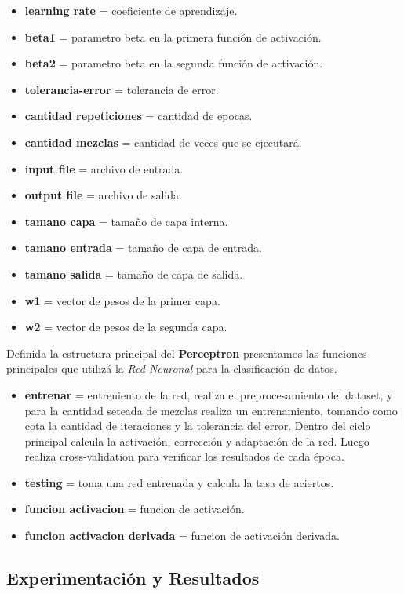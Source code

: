 \documentclass[onecolumn,10pt]{article}
\begin{document}
\begin{itemize}
\item \textbf{learning rate} = coeficiente de aprendizaje.
\item \textbf{beta1} = parametro beta en la primera función de activación.
\item \textbf{beta2} = parametro beta en la segunda función de activación.
\item \textbf{tolerancia-error} = tolerancia de error.
\item \textbf{cantidad repeticiones} = cantidad de epocas.
\item \textbf{cantidad mezclas} = cantidad de veces que se ejecutará.
\item \textbf{input file} = archivo de entrada.
\item \textbf{output file} = archivo de salida.
\item \textbf{tamano capa} = tamaño de capa interna.
\item \textbf{tamano entrada} = tamaño de capa de entrada.
\item \textbf{tamano salida} = tamaño de capa de salida.
\item \textbf{w1} = vector de pesos de la primer capa.
\item \textbf{w2} = vector de pesos de la segunda capa.
\end{itemize}


Definida la estructura principal del \textbf{Perceptron} presentamos
las funciones principales que utilizá la \emph{Red Neuronal} para
la clasificación de datos.


\begin{itemize}
\item \textbf{entrenar} = entreniento de la red, realiza el preprocesamiento
del dataset, y para la cantidad seteada de mezclas realiza un entrenamiento, tomando
como cota la cantidad de iteraciones y la tolerancia del error. Dentro del ciclo principal
calcula la activación, corrección y adaptación de la red. Luego realiza cross-validation para
verificar los resultados de cada época.
\item \textbf{testing} = toma una red entrenada y calcula la tasa de aciertos.
\item \textbf{funcion activacion} = funcion de activación.
\item \textbf{funcion activacion derivada} = funcion de activación derivada.
\end{itemize}


\subsection{Experimentación y Resultados}
\end{document}
